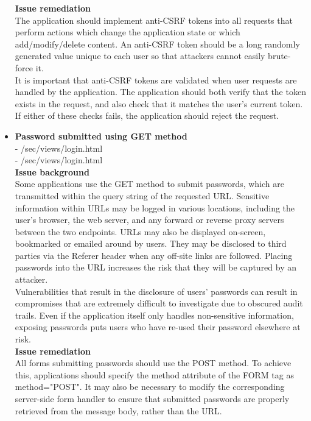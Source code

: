 \begin{itemize}
\textbf{Issue remediation} \\
The application should implement anti-CSRF tokens into all requests that perform actions which change the application state or which add/modify/delete content. An anti-CSRF token should be a long randomly generated value unique to each user so that attackers cannot easily brute-force it. \\ 

It is important that anti-CSRF tokens are validated when user requests are handled by the application. The application should both verify that the token exists in the request, and also check that it matches the user's current token. If either of these checks fails, the application should reject the request. 

\item \textbf{Password submitted using GET method} \\
- /sec/views/login.html \\
- /sec/views/login.html \\

\textbf{Issue background}\\
Some applications use the GET method to submit passwords, which are transmitted within the query string of the requested URL. Sensitive information within URLs may be logged in various locations, including the user's browser, the web server, and any forward or reverse proxy servers between the two endpoints. URLs may also be displayed on-screen, bookmarked or emailed around by users. They may be disclosed to third parties via the Referer header when any off-site links are followed. Placing passwords into the URL increases the risk that they will be captured by an attacker. \\

Vulnerabilities that result in the disclosure of users' passwords can result in compromises that are extremely difficult to investigate due to obscured audit trails. Even if the application itself only handles non-sensitive information, exposing passwords puts users who have re-used their password elsewhere at risk. \\

\textbf{Issue remediation}\\
All forms submitting passwords should use the POST method. To achieve this, applications should specify the method attribute of the FORM tag as method="POST". It may also be necessary to modify the corresponding server-side form handler to ensure that submitted passwords are properly retrieved from the message body, rather than the URL.


\end{itemize}
